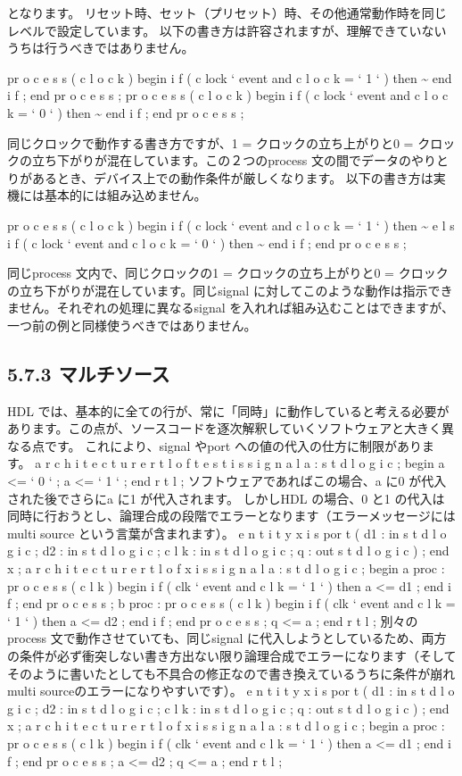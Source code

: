 \documentclass[letterpaper,10pt,dvipdfmx]{sphinxmanual}
\begin{document}
となります。
リセット時、セット（プリセット）時、その他通常動作時を同じレベルで設定しています。
以下の書き方は許容されますが、理解できていないうちは行うべきではありません。

pr o c e s s ( c l o c k )
begin
i f ( c lock ` event and c l o c k = ` 1 ` ) then
\textasciitilde{}
end i f ;
end pr o c e s s ;
pr o c e s s ( c l o c k )
begin
i f ( c lock ` event and c l o c k = ` 0 ` ) then
\textasciitilde{}
end i f ;
end pr o c e s s ;

同じクロックで動作する書き方ですが、1 = クロックの立ち上がりと0 = クロックの立ち下がりが混在しています。この２つのprocess 文の間でデータのやりとりがあるとき、デバイス上での動作条件が厳しくなります。
以下の書き方は実機には基本的には組み込めません。

pr o c e s s ( c l o c k )
begin
i f ( c lock ` event and c l o c k = ` 1 ` ) then
\textasciitilde{}
e l s i f ( c lock ` event and c l o c k = ` 0 ` ) then
\textasciitilde{}
end i f ;
end pr o c e s s ;

同じprocess 文内で、同じクロックの1 = クロックの立ち上がりと0 = クロックの立ち下がりが混在しています。同じsignal に対してこのような動作は指示できません。それぞれの処理に異なるsignal を入れれば組み込むことはできますが、一つ前の例と同様使うべきではありません。


\subsection{5.7.3 マルチソース}
\label{05_try:id11}
HDL では、基本的に全ての行が、常に「同時」に動作していると考える必要があります。この点が、ソースコードを逐次解釈していくソフトウェアと大きく異なる点です。
これにより、signal やport への値の代入の仕方に制限があります。
a r c h i t e c t u r e r t l o f t e s t i s
s i g n a l a : s t d l o g i c ;
begin
a \textless{}= ` 0 ` ;
a \textless{}= ` 1 ` ;
end r t l ;
ソフトウェアであればこの場合、a に0 が代入された後でさらにa に1 が代入されます。
しかしHDL の場合、0 と1 の代入は同時に行おうとし、論理合成の段階でエラーとなります（エラーメッセージにはmulti source という言葉が含まれます）。
e n t i t y x i s
por t (
d1 : in s t d l o g i c ;
d2 : in s t d l o g i c ;
c l k : in s t d l o g i c ;
q : out s t d l o g i c
) ;
end x ;
a r c h i t e c t u r e r t l o f x i s
s i g n a l a : s t d l o g i c ;
begin
a proc : pr o c e s s ( c l k )
begin
i f ( clk ` event and c l k = ` 1 ` ) then
a \textless{}= d1 ;
end i f ;
end pr o c e s s ;
b proc : pr o c e s s ( c l k )
begin
i f ( clk ` event and c l k = ` 1 ` ) then
a \textless{}= d2 ;
end i f ;
end pr o c e s s ;
q \textless{}= a ;
end r t l ;
別々のprocess 文で動作させていても、同じsignal に代入しようとしているため、両方の条件が必ず衝突しない書き方出ない限り論理合成でエラーになります（そしてそのように書いたとしても不具合の修正なので書き換えているうちに条件が崩れmulti sourceのエラーになりやすいです）。
e n t i t y x i s
por t (
d1 : in s t d l o g i c ;
d2 : in s t d l o g i c ;
c l k : in s t d l o g i c ;
q : out s t d l o g i c
) ;
end x ;
a r c h i t e c t u r e r t l o f x i s
s i g n a l a : s t d l o g i c ;
begin
a proc : pr o c e s s ( c l k )
begin
i f ( clk ` event and c l k = ` 1 ` ) then
a \textless{}= d1 ;
end i f ;
end pr o c e s s ;
a \textless{}= d2 ;
q \textless{}= a ;
end r t l ;
\end{document}
